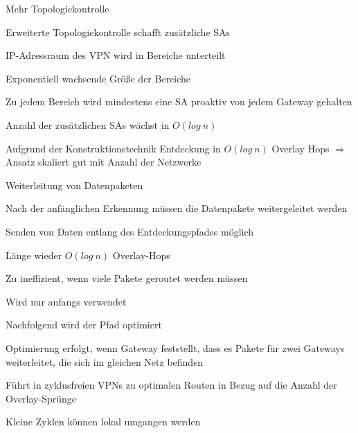 \documentclass[a4paper]{article}
\begin{document}
\begin{multicols}{3}
      Mehr Topologiekontrolle
      \begin{itemize*}
            \item Erweiterte Topologiekontrolle schafft zusätzliche SAs
            \item IP-Adressraum des VPN wird in Bereiche unterteilt
            \item Exponentiell wachsende Größe der Bereiche
            \item Zu jedem Bereich wird mindestens eine SA proaktiv von jedem Gateway gehalten
            \item Anzahl der zusätzlichen SAs wächst in $O(log\ n)$
            \item Aufgrund der Konstruktionstechnik Entdeckung in $O(log\ n)$ Overlay Hops $\Rightarrow$ Ansatz skaliert gut mit Anzahl der Netzwerke
      \end{itemize*}

      Weiterleitung von Datenpaketen
      \begin{itemize*}
            \item Nach der anfänglichen Erkennung müssen die Datenpakete weitergeleitet werden
            \item Senden von Daten entlang des Entdeckungspfades möglich
            \item Länge wieder $O(log\ n)$ Overlay-Hops
            \item Zu ineffizient, wenn viele Pakete geroutet werden müssen
            \item Wird nur anfangs verwendet
            \item Nachfolgend wird der Pfad optimiert
            \item Optimierung erfolgt, wenn Gateway feststellt, dass es Pakete für zwei Gateways weiterleitet, die sich im gleichen Netz befinden
            \item Führt in zyklusfreien VPNs zu optimalen Routen in Bezug auf die Anzahl der Overlay-Sprünge
            \item Kleine Zyklen können lokal umgangen werden
      \end{itemize*}


\end{multicols}
\end{document}
